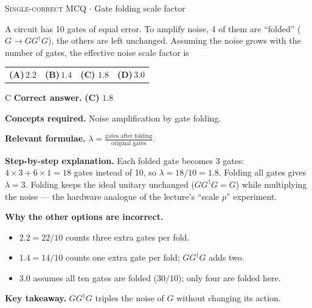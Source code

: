 \documentclass[11pt,a4paper]{article}
\newcommand{\optlabel}[1]{\textbf{(#1)}}
\newcommand{\correctlabel}[1]{\textcolor{okgreen}{\textbf{(#1)}\,\ding{51}}}
\newenvironment{qitem}[1]{\begin{list}{}{\setlength{\leftmargin}{3.3em}\setlength{\labelwidth}{3.1em}%
  \setlength{\labelsep}{0.2em}\setlength{\topsep}{3pt}\setlength{\parsep}{3pt}}\item[\textbf{Q.#1}\hfill]}{\end{list}}
\newcommand{\qsep}{\par\vspace{2pt}{\color{black!15}\hrule}\vspace{4pt}}
\newcommand{\qmeta}[2]{{\footnotesize\color{black!60}\textsc{#1} \;$\cdot$\; #2}\par}
\begin{document}
\begin{qitem}{65}
\qmeta{Single-correct MCQ}{Gate folding scale factor}
A circuit has 10 gates of equal error. To amplify noise, 4 of them are ``folded'' ($G \to GG^\dagger G$), the others are left unchanged. Assuming the noise grows with
the number of gates, the effective noise scale factor is
\par\smallskip\noindent\begin{tabularx}{\linewidth}{@{}*{4}{L}@{}}
\optlabel{A}\,$2.2$ & \optlabel{B}\,$1.4$ & \correctlabel{C}\,$1.8$ & \optlabel{D}\,$3.0$
\end{tabularx}
\end{qitem}
\begin{solbox}{C}
\textbf{\color{brand}Correct answer.} \textcolor{okgreen}{\textbf{(C)}} $1.8$

\textbf{\color{brand}Concepts required.} Noise amplification by gate folding.

\textbf{\color{brand}Relevant formulae.} $\lambda = \frac{\text{gates after folding}}{\text{original gates}}$.

\textbf{\color{brand}Step-by-step explanation.} Each folded gate becomes 3 gates: $4\times3 + 6\times1 = 18$ gates instead of 10, so $\lambda = 18/10 = 1.8$. Folding all gates gives $\lambda = 3$.
Folding keeps the ideal unitary unchanged ($GG^\dagger G = G$) while multiplying the noise --- the hardware analogue of the lecture's ``scale $p$'' experiment.

\textbf{\color{brand}Why the other options are incorrect.}
\begin{itemize}[leftmargin=2.4em, itemsep=1pt, topsep=2pt]
\item[\textbf{(A)}] $2.2 = 22/10$ counts three extra gates per fold.
\item[\textbf{(B)}] $1.4 = 14/10$ counts one extra gate per fold; $GG^\dagger G$ adds two.
\item[\textbf{(D)}] $3.0$ assumes all ten gates are folded ($30/10$); only four are folded here.
\end{itemize}
\textbf{\color{brand}Key takeaway.} $GG^\dagger G$ triples the noise of $G$ without changing its action.
\end{solbox}
\qsep
\end{document}
